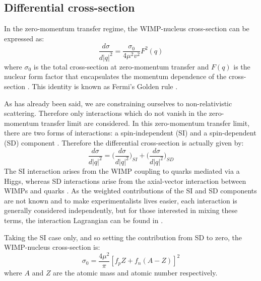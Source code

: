 \subsection{Differential cross-section}
In the zero-momentum transfer regime, the WIMP-nucleus cross-section can be expressed as:
\begin{equation}
    \frac{d\sigma}{d|q|^2} = \frac{\sigma_0}{4\mu^2 v^2} F^2(q)
\end{equation}
where $\sigma_0$ is the total cross-section at zero-momentum transfer and $F(q)$ is the nuclear form factor that encapsulates the momentum dependence of the cross-section \cite{shaunalsum_thesis_ref}.
This identity is known as Fermi's Golden rule \cite{shaunalsum_thesis_ref}.
\par
As has already been said, we are constraining ourselves to non-relativistic scattering.
Therefore only interactions which do not vanish in the zero-momentum transfer limit are considered.
In this zero-momentum transfer limit, there are two forms of interactions: a spin-independent (SI) and a spin-dependent (SD) component  \cite{wimp_lagrangian_ref}.
Therefore the differential cross-section is actually given by:
\begin{equation}
    \frac{d\sigma}{d|q|^2} = \bigg(\frac{d\sigma}{d|q|^2}\bigg)_{SI} + \bigg(\frac{d\sigma}{d|q|^2}\bigg)_{SD}
\end{equation}
The SI interaction arises from the WIMP coupling to quarks mediated via a Higgs, whereas SD interactions arise from the axial-vector interaction between WIMPs and quarks \cite{supersymmetric_dark_matter_ref}.
As the weighted contributions of the SI and SD components are not known and to make experimentalists lives easier, each interaction is generally considered independently, but for those interested in mixing these terms, the interaction Lagrangian can be found in \cite{wimp_lagrangian_ref}.
\par
Taking the SI case only, and so setting the contribution from SD to zero, the WIMP-nucleus cross-section is:
\begin{equation}
    \sigma_0 = \frac{4\mu^2}{\pi} [f_pZ + f_n (A-Z)]^2
\end{equation}
where $A$ and $Z$ are the atomic mass and atomic number respectively.
